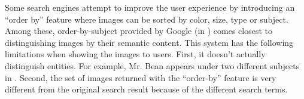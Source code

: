 Some search engines attempt to improve the user experience by introducing
an ``order by'' feature where images can be sorted by color, size, type
or subject. Among these, order-by-subject provided by Google
(in ) comes closest to distinguishing
images by their semantic content.
This system has the following limitations when showing the images to users.
First, it doesn't actually distinguish entities. For example, Mr. Bean appears
under two different subjects in .
Second, the set of images returned with the ``order-by'' feature
is very different from the original search result because of the different
search terms.


%
%

